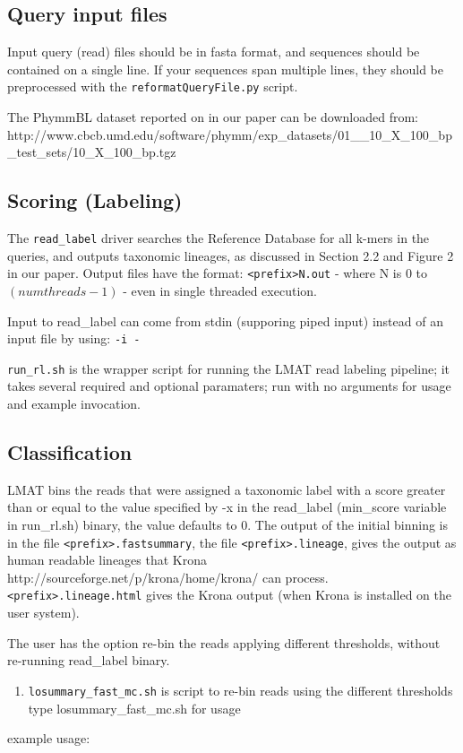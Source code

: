 \documentclass[11pt]{article}
\begin{document}
\subsection{Query input files}

Input query (read) files should be in fasta format, and sequences should
be contained on a single line. If your sequences span multiple lines,
they should be preprocessed with the \texttt{reformatQueryFile.py} script.

The PhymmBL dataset reported on in our paper can be downloaded from:\\
http://www.cbcb.umd.edu/software/phymm/exp\_datasets/01\_\_10\_X\_100\_bp\_test\_sets/10\_X\_100\_bp.tgz

\subsection{Scoring (Labeling)}

The \texttt{read\_label} driver searches the Reference Database for all k-mers 
in the queries, and outputs taxonomic lineages, as discussed in Section 2.2 and
Figure 2 in our paper.  Output files have the format: \texttt{<prefix>N.out} - where N is 0 to
$(numthreads-1)$ - even in single threaded execution.  

Input to read\_label can come from stdin (supporing piped input) instead of an input file by using: \texttt{-i -}


\texttt{run\_rl.sh} is the wrapper script for running the LMAT read labeling pipeline; it takes several required 
and optional paramaters; run with no arguments for usage and example invocation.

\subsection{Classification}

LMAT bins the reads that were assigned a taxonomic label with a score greater than or equal to the value specified by -x in the read_label (min_score variable in run\_rl.sh) binary, the value defaults to 0.
The output of the initial binning is in the file \texttt{<prefix>.fastsummary}, the file \texttt{<prefix>.lineage}, gives the output as human readable lineages that Krona {http://sourceforge.net/p/krona/home/krona/}
can process. \texttt{<prefix>.lineage.html} gives the Krona output (when Krona is installed on the user system).

The user has the option re-bin the reads applying different thresholds, without re-running read\_label binary. 
\begin{enumerate}
\item
\texttt{losummary\_fast\_mc.sh} is script to re-bin reads using the different thresholds
type losummary\_fast\_mc.sh for usage
\end{enumerate}
example usage:
 
\end{document}

